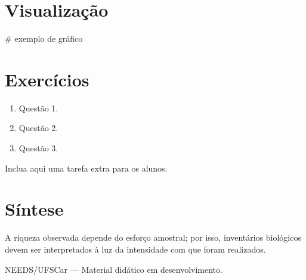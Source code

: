 \documentclass[
  letterpaper,
  DIV=11,
  numbers=noendperiod]{scrartcl}
\newenvironment{Shaded}{\begin{snugshade}}{\end{snugshade}}
\newcommand{\CommentTok}[1]{\textcolor[rgb]{0.37,0.37,0.37}{#1}}
\providecommand{\tightlist}{%
  \setlength{\itemsep}{0pt}\setlength{\parskip}{0pt}}
\begin{document}
\section{Visualização}\label{visualizauxe7uxe3o}

\begin{Shaded}
\begin{Highlighting}[]
\CommentTok{\# exemplo de gráfico}
\end{Highlighting}
\end{Shaded}

\section{Exercícios}\label{exercuxedcios}

\begin{enumerate}
\def\labelenumi{\arabic{enumi}.}
\tightlist
\item
  Questão 1.
\item
  Questão 2.
\item
  Questão 3.
\end{enumerate}

\begin{tcolorbox}[enhanced jigsaw, arc=.35mm, bottomrule=.15mm, bottomtitle=1mm, breakable, colback=white, colbacktitle=quarto-callout-important-color!10!white, colframe=quarto-callout-important-color-frame, coltitle=black, left=2mm, leftrule=.75mm, opacityback=0, opacitybacktitle=0.6, rightrule=.15mm, title=\textcolor{quarto-callout-important-color}{\faExclamation}\hspace{0.5em}{Desafio}, titlerule=0mm, toprule=.15mm, toptitle=1mm]

Inclua aqui uma tarefa extra para os alunos.

\end{tcolorbox}

\section{Síntese}\label{suxedntese}

A riqueza observada depende do esforço amostral; por isso, inventários
biológicos devem ser interpretados à luz da intensidade com que foram
realizados.

NEEDS/UFSCar --- Material didático em desenvolvimento.
\end{document}
